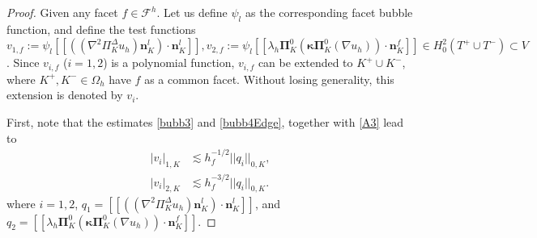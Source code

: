 \documentclass[final,reqno]{elsarticle}
\def\PiK{\Pi_{K}^{\Delta}}
\newcommand{\jump}[1]{[\![#1]\!]}
\def\bn{\boldsymbol{n}}
\def\bkappa{\boldsymbol{\kappa}}
\def\bPi{\mathbf{\Pi}}
\begin{document}
\begin{proof}
Given any facet $f\in \mathcal{F}^h$. Let us define $\psi_l$ as the corresponding facet bubble function, and define the test functions $v_{1,f}:=\psi_l\jump{((\nabla^2\PiK u_h )\boldsymbol{n}_K^{l}) \cdot \boldsymbol{n}_K^{l}},v_{2,f}:=\psi_l\jump{\lambda_h\bPi_K^0(\bkappa \bPi_K^0(\nabla u_h ))\cdot \bn_K^f}\in H_0^2(T^+\cup T^-)\subset V$. Since $v_{i,f}$ ($i=1,2$) is a polynomial function, $v_{i,f}$ can be extended to $K^+\cup K^-$, where $K^+,K^-\in\Omega_h$ have $f$ as a common facet. Without losing generality, this extension is denoted by $v_i$. 

First, note that the estimates \eqref{bubb3} and \eqref{bubb4Edge}, together with \eqref{A3} lead to 
\begin{subequations}
    \begin{align}
        |v_i|_{1,K} &\lesssim h_f^{-1/2}||q_i||_{0,K}, \label{aux2-3_effa_edge}\\ 
        |v_i|_{2,K} &\lesssim  h_f^{-3/2} ||q_i||_{0,K}.\label{aux2-3_effb_edge}
    \end{align}
\end{subequations}
where $i=1,2$, $q_1=\jump{((\nabla^2\PiK u_h )\boldsymbol{n}_K^{l}) \cdot \boldsymbol{n}_K^{l}}$, and $q_2=\jump{\lambda_h\bPi_K^0(\bkappa \bPi_K^0(\nabla u_h ))\cdot \bn_K^f}.$


\end{proof}
\end{document}
